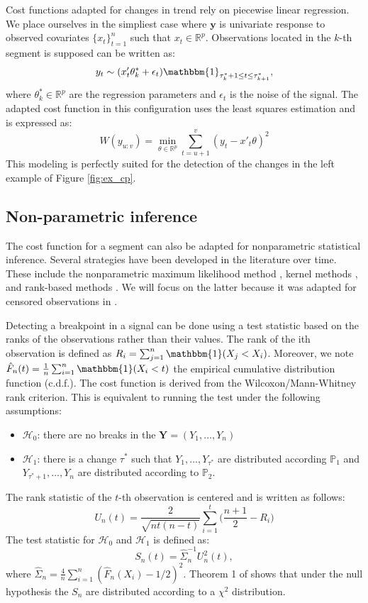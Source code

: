 Cost functions adapted for changes in trend rely on piecewise linear regression. We place ourselves in the simpliest case where $\bm y$ is univariate response to observed covariates $\{x_t\}_{t=1}^n$ such that $x_t \in \mathbb{R}^p$. Observations located in the $k$-th segment is supposed can be written as:   
$$y_t \sim (x'_t\theta^*_k + \epsilon_t)\mathbbm{1}_{\tau^*_{k}+1\leq t \leq \tau^*_{k+1}},$$
where $\theta^*_k \in \mathbb{R}^p$ are the regression parameters and $\epsilon_t$ is the noise of the signal. The adapted cost function in this configuration uses the least squares estimation and is expressed as:
$$W(y_{u:v}) = \min_{\theta \in \mathbb{R}^p}\sum_{t=u+1}^v(y_t-x'_t\theta)^2$$ 
This modeling is perfectly suited for the detection of the changes in the left example of Figure \ref{fig:ex_cp}. 



\subsection{Non-parametric inference}

The cost function for a segment can also be adapted for nonparametric statistical inference. Several strategies have been developed in the literature over time. These include the nonparametric maximum likelihood method \cite{Zou2014,Einmahl2003}, kernel methods \cite{Harchaoui2008,li2015m}, and rank-based methods \cite{Pettitt1980,Wang2019}. We will focus on the latter because it was adapted for censored observations in \cite{lung2015}.  

Detecting a breakpoint in a signal can be done using a test statistic based on the ranks of the observations rather than their values. The rank of the ith observation is defined as $R_i = \sum_{j =1}^n\mathbbm{1}(X_j < X_i)$. Moreover, we note $\hat{F}_n(t) = \frac{1}{n}\sum_{i = 1}^n\mathbbm{1}(X_i < t)$ the empirical cumulative distribution function (c.d.f.). The cost function is derived from the Wilcoxon/Mann-Whitney rank criterion. This is equivalent to running the test under the following assumptions: 
\begin{itemize}
  \item $\mathcal{H}_0$: there are no breaks in the $\bm Y = (Y_1,...,Y_n)$ 
  \item $\mathcal{H}_1$: there is a change $\tau^*$ such that $Y_1,...,Y_{\tau^*}$ are distributed according $\mathbb{P}_1$ and $Y_{\tau^*+1},...,Y_{n}$ are distributed according to $\mathbb{P}_2$. 
\end{itemize}
The rank statistic of the $t$-th observation is centered and is written as follows:
\begin{equation}\label{chp2:statranknp}
  U_n(t) = \frac{2}{\sqrt{nt(n-t)}}\sum_{i = 1}^{t}\bigg(\frac{n+1}{2} - R_i\bigg)
\end{equation}
The test statistic for $\mathcal{H}_0$ and $\mathcal{H}_1$ is defined as:
\begin{equation}\label{chp2:stattestnp}
  S_n(t) = \hat{\Sigma}_n^{-1} U^2_n(t),
\end{equation}
where $\hat{\Sigma}_n = \frac{4}{n}\sum_{i=1}^n(\hat{F}_n(X_i)-1/2)^2$. Theorem 1 of \cite{lung2015} shows that under the null hypothesis the $S_n$ are distributed according to a $\chi^2$ distribution.

